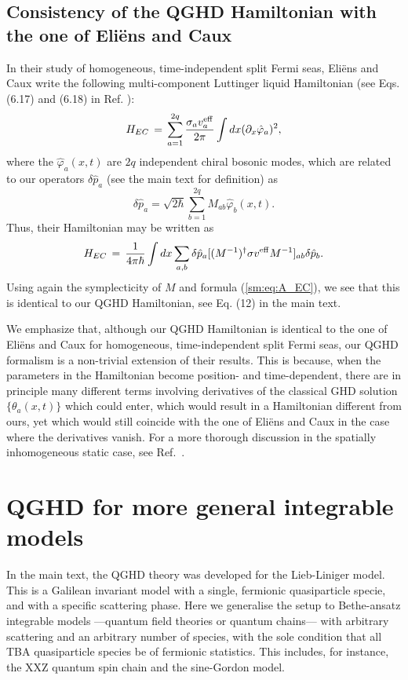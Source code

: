 \documentclass[twocolumn,amsfonts,showpacs,superscriptaddress]{revtex4-1}
\begin{document}
\begin{widetext}
\subsection{Consistency of the QGHD Hamiltonian with the one of Eli\"ens and Caux}

In their study of homogeneous, time-independent split Fermi seas, Eli\"ens and Caux write the following multi-component Luttinger liquid Hamiltonian (see Eqs. (6.17) and (6.18) in Ref. \cite{eliens2017quantum}):
\begin{equation}
	H_{EC} \, = \, \sum_{a=1}^{2q} \frac{\sigma_a v^{\rm eff}_a}{2\pi} \int dx (\partial_x \hat{\varphi}_{a})^2 ,
\end{equation}
where the $\hat{\varphi}_a (x,t)$ are $2q$ independent chiral bosonic modes, which are related to our operators $\delta \hat{p}_a$ (see the main text for definition) as
\begin{equation}
	\delta \hat{p}_a = \sqrt{2 \hbar} \sum_{b=1}^{2q} M_{ab} \hat{\varphi}_b (x,t) .
\end{equation}
Thus, their Hamiltonian may be written as
\begin{equation}
	H_{EC} \, = \, \frac{1}{4\pi \hbar} \int dx \sum_{a,b} \delta \hat{p}_a [(M^{-1})^{\dagger} \sigma v^{\rm eff} M^{-1}]_{ab} \delta \hat{p}_b .
\end{equation}
Using again the symplecticity of $M$ and formula (\ref{sm:eq:A_EC}), we see that this is identical to our QGHD Hamiltonian, see Eq. (12) in the main text. 


We emphasize that, although our QGHD Hamiltonian is identical to the one of Eli\"ens and Caux for homogeneous, time-independent split Fermi seas, our QGHD formalism is a non-trivial extension of their results. This is because, when the parameters in the Hamiltonian become position- and time-dependent, there are in principle many different
terms involving derivatives of the classical GHD solution $\{ \theta_a (x,t) \}$ which could enter, which would result in a Hamiltonian different from ours, yet which would still coincide with the one of Eli\"ens and Caux in the case where the derivatives vanish. For a more thorough discussion in the spatially inhomogeneous static case, see Ref.~\cite{brun2018inhomogeneous}.


\section{QGHD for more general integrable models}

In the main text, the QGHD theory was developed for the Lieb-Liniger model. This is a Galilean invariant model with a single, fermionic quasiparticle specie, and with a specific scattering phase. Here we generalise the setup to Bethe-ansatz integrable models ---quantum field theories or quantum chains--- with arbitrary scattering and an arbitrary number of species, with the sole condition that all TBA quasiparticle species be of fermionic statistics. This includes, for instance, the XXZ quantum spin chain and the sine-Gordon model.


\end{widetext}
\end{document}
